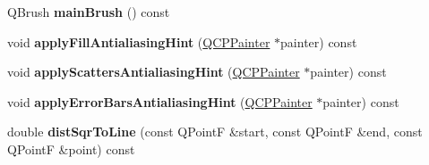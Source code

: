 \begin{DoxyCompactItemize}
\item 
\hypertarget{classQCPAbstractPlottable_ae74c123832da180c17e22203e748d9b7}{}Q\+Brush {\bfseries main\+Brush} () const \label{classQCPAbstractPlottable_ae74c123832da180c17e22203e748d9b7}

\item 
\hypertarget{classQCPAbstractPlottable_ac08a480155895e674dbfe5a5670e0ff3}{}void {\bfseries apply\+Fill\+Antialiasing\+Hint} (\hyperlink{classQCPPainter}{Q\+C\+P\+Painter} $\ast$painter) const \label{classQCPAbstractPlottable_ac08a480155895e674dbfe5a5670e0ff3}

\item 
\hypertarget{classQCPAbstractPlottable_a753272ee225a62827e90c3e1e78de4b1}{}void {\bfseries apply\+Scatters\+Antialiasing\+Hint} (\hyperlink{classQCPPainter}{Q\+C\+P\+Painter} $\ast$painter) const \label{classQCPAbstractPlottable_a753272ee225a62827e90c3e1e78de4b1}

\item 
\hypertarget{classQCPAbstractPlottable_af687bfe6160255960558eb71f1f81e73}{}void {\bfseries apply\+Error\+Bars\+Antialiasing\+Hint} (\hyperlink{classQCPPainter}{Q\+C\+P\+Painter} $\ast$painter) const \label{classQCPAbstractPlottable_af687bfe6160255960558eb71f1f81e73}

\item 
\hypertarget{classQCPAbstractPlottable_a5ea1cab44ca912dcdc96ed81ec5bed5d}{}double {\bfseries dist\+Sqr\+To\+Line} (const Q\+Point\+F \&start, const Q\+Point\+F \&end, const Q\+Point\+F \&point) const \label{classQCPAbstractPlottable_a5ea1cab44ca912dcdc96ed81ec5bed5d}

\end{DoxyCompactItemize}
